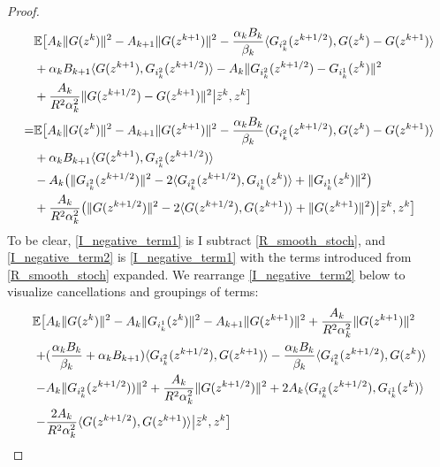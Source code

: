 \documentclass[11pt,reqno,oneside]{amsart}
\theoremstyle{definition}
\numberwithin{equation}{section}
\begin{document}
\begin{proof}
\begin{align}
        & \mathbb{E}\big{[} A_{k}\|G(z^{k})\|^{2} - A_{k+1}\|G(z^{k+1})\|^{2} - \frac{\alpha_{k}B_{k}}{\beta_{k}}\langle G_{i_{k}^{2}}(z^{k+1/2}),G(z^{k}) - G(z^{k+1}) \rangle \notag \\
        & + \alpha_{k}B_{k+1}\langle G(z^{k+1}),G_{i_{k}^{2}}(z^{k+1/2}) \rangle -A_{k} \|G_{i_{k}^{2}}(z^{k+1/2}) - G_{i_{k}^{1}}(z^{k})\|^{2} \notag \\
        & + \frac{A_{k}}{R^{2}\alpha_{k}^{2}}\|G(z^{k+1/2}) - G(z^{k+1})\|^{2} \big{|} \bar{z}^{k}, z^{k}\big{]} \label{I_negative_term1} \\
        = & \mathbb{E}\big{[} A_{k}\|G(z^{k})\|^{2} - A_{k+1}\|G(z^{k+1})\|^{2} - \frac{\alpha_{k}B_{k}}{\beta_{k}}\langle G_{i_{k}^{2}}(z^{k+1/2}),G(z^{k}) - G(z^{k+1}) \rangle \notag \\
        & + \alpha_{k}B_{k+1}\langle G(z^{k+1}),G_{i_{k}^{2}}(z^{k+1/2}) \rangle \notag \\
        & -A_{k} \big{(} \|G_{i_{k}^{2}}(z^{k+1/2})\|^{2} - 2\langle G_{i_{k}^{2}}(z^{k+1/2}),G_{i_{k}^{1}}(z^{k}) \rangle + \|G_{i_{k}^{1}}(z^{k})\|^{2} \big{)} \notag \\
        & + \frac{A_{k}}{R^{2}\alpha_{k}^{2}} \big{(}\|G(z^{k+1/2})\|^{2} - 2\langle G(z^{k+1/2}), G(z^{k+1})\rangle +\|G(z^{k+1})\|^{2}\big{)} \big{|} \bar{z}^{k}, z^{k} \big{]} \label{I_negative_term2}
    \end{align}
    To be clear, \eqref{I_negative_term1} is I subtract \eqref{R_smooth_stoch}, and \eqref{I_negative_term2} is \eqref{I_negative_term1} with the terms introduced from \eqref{R_smooth_stoch} expanded.
    We rearrange \eqref{I_negative_term2} below to visualize cancellations and groupings of terms:
    \begin{align}
        \mathbb{E}\big{[} &A_{k}\|G(z^{k})\|^{2} -A_{k}\|G_{i_{k}^{1}}(z^{k})\|^{2} -A_{k+1}\|G(z^{k+1})\|^{2} + \frac{A_{k}}{R^{2}\alpha_{k}^{2}}\|G(z^{k+1})\|^{2} \notag \\
        +&(\frac{\alpha_{k}B_{k}}{\beta_{k}} + \alpha_{k}B_{k+1})\langle G_{i_{k}^{2}}(z^{k+1/2}),G(z^{k+1})\rangle - \frac{\alpha_{k}B_{k}}{\beta_{k}}\langle G_{i_{k}^{2}}(z^{k+1/2}),G(z^{k}) \rangle\notag \\
        -& A_{k}\|G_{i_{k}^{2}}(z^{k+1/2}))\|^{2} + \frac{A_{k}}{R^{2}\alpha_{k}^{2}}\|G(z^{k+1/2})\|^{2} + 2A_{k}\langle G_{i_{k}^{2}}(z^{k+1/2}),G_{i_{k}^{1}}(z^{k})\rangle \notag \\
        -&\frac{2A_{k}}{R^{2}\alpha_{k}^{2}}\langle G(z^{k+1/2}),G(z^{k+1}) \rangle\big{|} \bar{z}^{k}, z^{k}\big{]} \label{need_stoch_cancels} \\

\end{align}
\end{proof}
\end{document}
